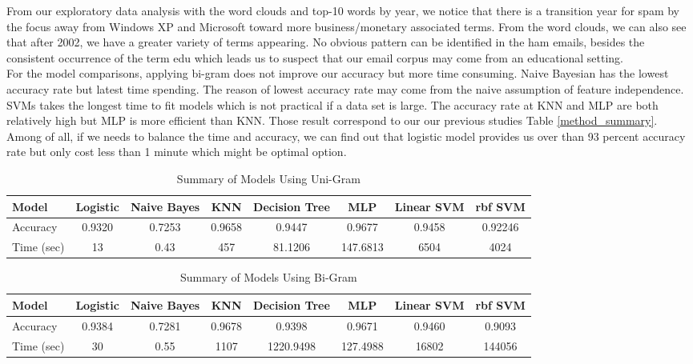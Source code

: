 From our exploratory data analysis with the word clouds and top-10 words by year, we notice that there is a transition year for spam by the focus away from Windows XP and Microsoft toward more business/monetary associated terms. From the word clouds, we can also see that after 2002, we have a greater variety of terms appearing. No obvious pattern can be identified in the ham emails, besides the consistent occurrence of the term edu which leads us to suspect that our email corpus may come from an educational setting.\\

For the model comparisons, applying bi-gram does not improve our accuracy but more time consuming. Naive Bayesian has the lowest accuracy rate but latest time spending. The reason of lowest accuracy rate may come from the naive assumption of feature independence. SVMs takes the longest time to fit  models which is not practical if a data set is large. The accuracy rate at KNN and MLP are both relatively high but MLP is more efficient than KNN. Those result correspond to our our previous studies Table \ref{method_summary}. Among of all, if we needs to balance the time and accuracy, we can find out that logistic model provides us over than 93 percent accuracy rate but only cost less than 1 minute which might be optimal option.

\begin{table}[H]
	\centering
	\caption{Summary of Models Using Uni-Gram}
	\label{Summary-one-gram}
	\begin{tabular}{lccccccc}
		\hline
		Model    & Logistic  & Naive Bayes & KNN    & Decision Tree & MLP & Linear SVM  & rbf SVM \\ \hline
		Accuracy&  0.9320   & 0.7253       & 0.9658 & 0.9447        & 0.9677 & 0.9458  & 0.92246 \\
		Time (sec) & 13 & 0.43 &  457 & 81.1206  & 147.6813 & 6504       & 4024    \\ \hline
	\end{tabular}
\end{table}

\begin{table}[H]
	\centering
	\caption{Summary of Models Using Bi-Gram}
	\label{Summary-bi-gram}
	\begin{tabular}{lccccccc}
		\hline
		Model      & Logistic & Naive Bayes & KNN    & Decision Tree & MLP & Linear SVM & rbf SVM \\ \hline
		Accuracy   & 0.9384   & 0.7281      & 0.9678 & 0.9398        &     0.9671 & 0.9460     & 0.9093  \\
		Time (sec) & 30       & 0.55        & 1107   & 1220.9498     &    127.4988 & 16802      & 144056  \\ \hline
	\end{tabular}
\end{table}
